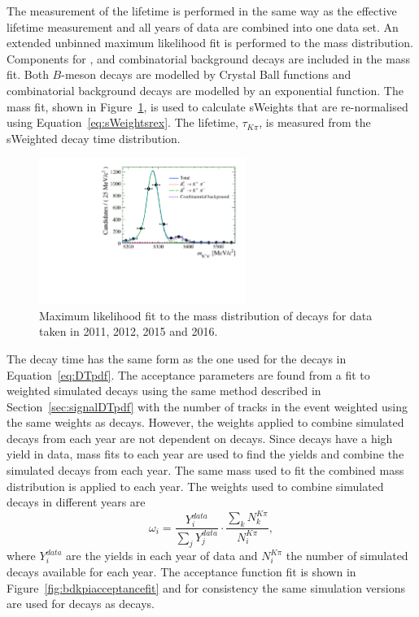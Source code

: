 The measurement of the \bdki lifetime is performed in the same way as the \bsmumu effective lifetime measurement and all years of data are combined into one data set. An extended unbinned maximum likelihood fit is performed to the \bdkpi mass distribution. Components for \bdkpi, \bskpi and combinatorial background decays are included in the mass fit. Both $B$-meson decays are modelled by Crystal Ball functions and combinatorial background decays are modelled by an exponential function. The mass fit, shown in Figure~\ref{fig:bdkpimassfit}, is used to calculate sWeights that are re-normalised using Equation~\ref{eq:sWeightsrex}. The lifetime, $\tau_{K\pi}$, is  measured from the sWeighted decay time distribution. 

\begin{figure}[tbp]
\centering
  \includegraphics[width=0.6\textwidth]{./Figs/LifetimeSystematics/Bd2KPi_mass_fit.pdf}
\caption{Maximum likelihood fit to the mass distribution of \bdkpi decays for data taken in 2011, 2012, 2015 and 2016.}%
\label{fig:bdkpimassfit}
\end{figure}


The decay time \pdf has the same form as the one used for the \bsmumu decays in Equation~\ref{eq:DTpdf}. The acceptance parameters are found from a fit to weighted \bdkpi simulated decays using the same method described in Section~\ref{sec:signalDTpdf} with the number of tracks in the event weighted using the same weights as \bsmumu decays. However, the weights applied to combine simulated \bdkpi decays from each year are not dependent on \bsjpsiphi decays. Since \bdkpi decays have a high yield in data, mass fits to each year are used to find the yields and combine the simulated decays from each year. The same mass \pdf used to fit the combined mass distribution is applied to each year. The weights used to combine simulated decays in different years are
\begin{equation}
\omega_{i}  = \frac{Y_{i}^{data}}{\displaystyle\sum_{j} Y_{j}^{data}} \cdot \frac{\displaystyle\sum_{k} N_{k}^{K\pi}}{N_{i}^{K\pi}},
\end{equation}
where $Y_{i}^{data}$ are the \bdkpi yields in each year of data and $N_{i}^{K\pi}$ the number of simulated decays available for each year.
The acceptance function fit is shown in Figure~\ref{fig:bdkpiacceptancefit} and for consistency the same simulation versions are used for \bdkpi decays as \bsmumu decays. 

